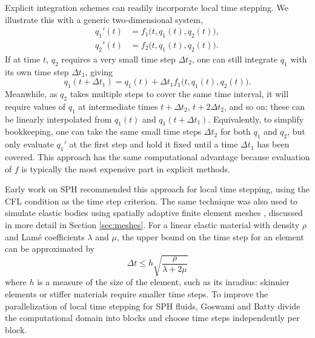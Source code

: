 Explicit integration schemes can readily incorporate local time stepping.
We illustrate this with a generic two-dimensional system,
\begin{align}
  q_1'(t) &= f_1\big(t, q_1(t), q_2(t)\big), \\
  q_2'(t) &= f_2\big(t, q_1(t), q_2(t)\big).
\end{align}
If at time $t$, $q_2$ requires a very small time step $\Delta t_2$, one can still integrate $q_1$ with its own time step $\Delta t_1$, giving
\begin{equation}
  q_1(t+\Delta t_1) = q_1(t) + \Delta t_1 f_1\big(t, q_1(t), q_2(t)\big).
\end{equation}
Meanwhile, as $q_2$ takes multiple steps to cover the same time interval, it will require values of $q_1$ at intermediate times $t+\Delta t_2$, $t+2\Delta t_2$, and so on; these can be linearly interpolated from $q_1(t)$ and $q_1(t+\Delta t_1)$.
Equivalently, to simplify bookkeeping, one can take the same small time steps $\Delta t_2$ for both $q_1$ and $q_2$, but only evaluate $q_1'$ at the first step and hold it fixed until a time $\Delta t_1$ has been covered.
This approach has the same computational advantage because evaluation of $f$ is typically the most expensive part in explicit methods.

Early work on SPH \cite{Desbrun1996,Desbrun1999} recommended this approach for local time stepping, using the CFL condition as the time step criterion.
The same technique was also used to simulate elastic bodies using spatially adaptive finite element meshes \cite{Debunne2001}, discussed in more detail in Section \ref{sec:meshes}.
For a linear elastic material with density $\rho$ and Lam\'e coefficients $\lambda$ and $\mu$, the upper bound on the time step for an element can be approximated by
\begin{equation}
  \label{eq:cfl-fem}
  \Delta t \le h\sqrt{\frac\rho{\lambda+2\mu}}
\end{equation}
where $h$ is a measure of the size of the element, such as its inradius: skinnier elements or stiffer materials require smaller time steps.
To improve the parallelization of local time stepping for SPH fluids, Goswami and Batty \cite{Goswami2014} divide the computational domain into blocks and choose time steps independently per block.
